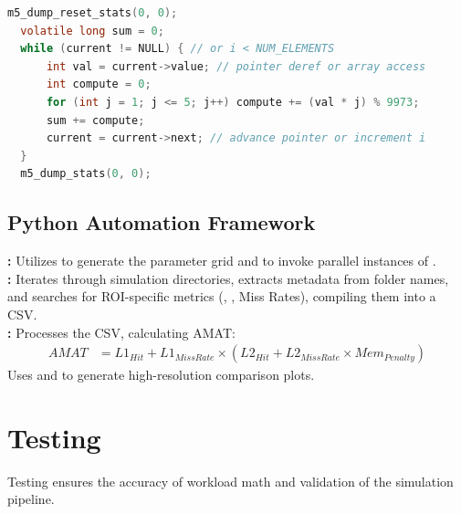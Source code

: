 \documentclass[12pt, a4paper]{report}
\begin{document}
\begin{lstlisting}[language=C, caption=Shared Computation Logic (Excerpt)]
  m5_dump_reset_stats(0, 0);
  volatile long sum = 0;
  while (current != NULL) { // or i < NUM_ELEMENTS
      int val = current->value; // pointer deref or array access
      int compute = 0;
      for (int j = 1; j <= 5; j++) compute += (val * j) % 9973;
      sum += compute;
      current = current->next; // advance pointer or increment i
  }
  m5_dump_stats(0, 0);
\end{lstlisting}

\section{Python Automation Framework}
\textbf{:} Utilizes  to generate the parameter grid and  to invoke parallel instances of .\\
\textbf{:} Iterates through simulation directories, extracts metadata from folder names, and searches  for ROI-specific metrics (, , Miss Rates), compiling them into a CSV.\\
\textbf{:} Processes the CSV, calculating AMAT:
\begin{align*}
    AMAT &= L1_{Hit} + L1_{MissRate} \times (L2_{Hit} + L2_{MissRate} \times Mem_{Penalty})
\end{align*}
Uses  and  to generate high-resolution comparison plots.

\chapter{Testing}
Testing ensures the accuracy of workload math and validation of the simulation pipeline.
\end{document}
